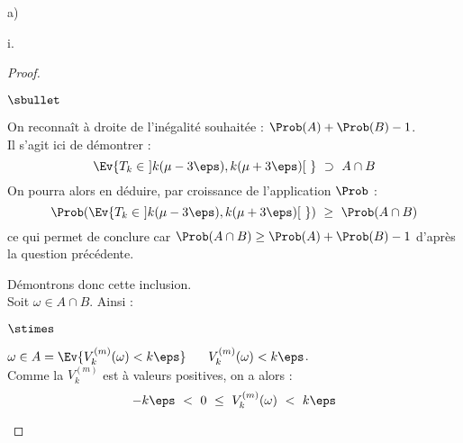 \begin{liste}{a)}
\begin{nonoliste}{i.}
    \begin{proof}~%
      \begin{noliste}{$\sbullet$}
      \item On reconnaît à droite de l'inégalité souhaitée : $\Prob(A)
        + \Prob(B) - 1$.\\
        Il s'agit ici de démontrer : 
        \[
        \Ev{ T_{k} \in \ ]k(\mu - 3 \eps), k(\mu + 3 \eps)[ \ } \
        \supset \ A \cap B
        \]
        On pourra alors en déduire, par croissance de l'application
        $\Prob$ :
        \[
        \Prob(\Ev{ T_{k} \in \ ]k(\mu - 3 \eps), k(\mu + 3 \eps)[ \ })
        \ \geq \ \Prob(A \cap B)
        \]
        ce qui permet de conclure car $\Prob(A \cap B) \geq \Prob(A) +
        \Prob(B) - 1$ d'après la question précédente.

      \item Démontrons donc cette inclusion.\\
        Soit $\omega \in A \cap B$. Ainsi :
        \begin{noliste}{$\stimes$}
        \item $\omega \in A = \Ev{V_{k}^{(m)}(\omega) < k \eps}$ \ \ie
          \ $V_{k}^{(m)}(\omega) < k \eps$.\\
          Comme la \var $V_{k}^{(m)}$ est à valeurs positives, on a
          alors :
          \[
          -k \eps \ < \ 0 \ \leq \ V_{k}^{(m)}(\omega) \ < \ k \eps
          \]


\end{noliste}
\end{noliste}
\end{proof}
\end{nonoliste}
\end{liste}
